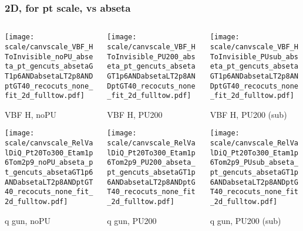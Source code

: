\documentclass[8pt]{beamer}
\begin{document}
   \begin{frame}
  \frametitle{2D, for pt scale, vs abseta}
  
  \begin{columns}
   \begin{column}{0.35\textwidth}
     \texttt{[image: scale/canvscale\_VBF\_HToInvisible\_noPU\_abseta\_pt\_gencuts\_absetaGT1p6ANDabsetaLT2p8ANDptGT40\_recocuts\_none\_fit\_2d\_fulltow.pdf]}
     
     VBF H, noPU
    
     \texttt{[image: scale/canvscale\_RelValDiQ\_Pt20To300\_Etam1p6Tom2p9\_noPU\_abseta\_pt\_gencuts\_absetaGT1p6ANDabsetaLT2p8ANDptGT40\_recocuts\_none\_fit\_2d\_fulltow.pdf]}
     
     q gun, noPU
   \end{column}
   \begin{column}{0.35\textwidth}
     \texttt{[image: scale/canvscale\_VBF\_HToInvisible\_PU200\_abseta\_pt\_gencuts\_absetaGT1p6ANDabsetaLT2p8ANDptGT40\_recocuts\_none\_fit\_2d\_fulltow.pdf]}
     
     VBF H, PU200
    
     \texttt{[image: scale/canvscale\_RelValDiQ\_Pt20To300\_Etam1p6Tom2p9\_PU200\_abseta\_pt\_gencuts\_absetaGT1p6ANDabsetaLT2p8ANDptGT40\_recocuts\_none\_fit\_2d\_fulltow.pdf]}
     
     q gun, PU200
   \end{column}
   \begin{column}{0.35\textwidth}
     \texttt{[image: scale/canvscale\_VBF\_HToInvisible\_PUsub\_abseta\_pt\_gencuts\_absetaGT1p6ANDabsetaLT2p8ANDptGT40\_recocuts\_none\_fit\_2d\_fulltow.pdf]}
     
     VBF H, PU200 (sub)
    
     \texttt{[image: scale/canvscale\_RelValDiQ\_Pt20To300\_Etam1p6Tom2p9\_PUsub\_abseta\_pt\_gencuts\_absetaGT1p6ANDabsetaLT2p8ANDptGT40\_recocuts\_none\_fit\_2d\_fulltow.pdf]}
     
     q gun, PU200 (sub)
   \end{column}
  \end{columns}
 \end{frame}
 
\end{document}
